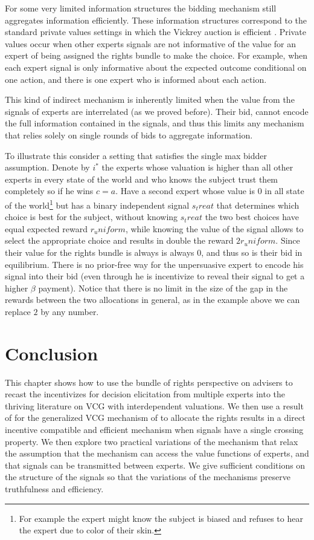  For some very limited information structures the bidding mechanism still aggregates information efficiently. 
 These information structures correspond to the standard private values settings in which the Vickrey auction is efficient \cite{vickrey1961}.
 Private values occur when other experts signals are not informative of the value for an expert of being assigned the rights bundle to make the choice.
 For example, when each expert signal is only informative about the expected outcome conditional on one action, and  there is one expert who is informed about each action.
 
 
 This kind of indirect mechanism is inherently limited when the value from the signals of experts are interrelated (as we proved before). Their bid, cannot encode the full information contained in the signals, and thus this limits any mechanism that relies solely on single rounds of bids to aggregate information.
 
 To illustrate this consider a setting that satisfies the single max bidder assumption. Denote by $i^*$ the experts whose valuation is higher than all other experts in every state of the world and who knows the subject trust them completely so if he wins $c=a$. Have a second expert whose value is $0$ in all state of the world\footnote{For example the expert might know the subject is biased and refuses to hear the expert due to color of their skin.} but has a binary independent signal $s_treat$ that determines which choice is best for the subject, without knowing $s_treat$ the two best choices have equal expected reward $r_uniform$, while knowing the value of the signal allows to select the appropriate choice and results in double the reward $2r_uniform$.
 Since their value for the rights bundle is always is always 0, and thus so is their bid in equilibrium. 
 There is no prior-free way for the unpersuasive expert to encode his signal into their bid (even through he is incentivize to reveal their signal to get a higher $\beta$ payment). 
 Notice that there is no limit in the size of the gap in the rewards between the two allocations in general, as in the example above we can replace $2$ by any number.
 
 

\section{Conclusion}

This chapter shows how to use the bundle of rights perspective on advisers to recast the incentivizes for decision elicitation from multiple experts into the thriving literature on VCG with interdependent valuations.
We then use a result of \cite{roughgarden2016optimal} for the generalized VCG mechanism of \cite{maskin1992auctions} to allocate the rights results in a direct incentive compatible and efficient mechanism when signals have a single crossing property.
We then explore two practical variations of the mechanism that relax the assumption that the mechanism can access the value functions of experts, and that signals can be transmitted between experts. We give sufficient conditions on the structure of the signals so that the variations of the mechanisms preserve truthfulness and efficiency.
